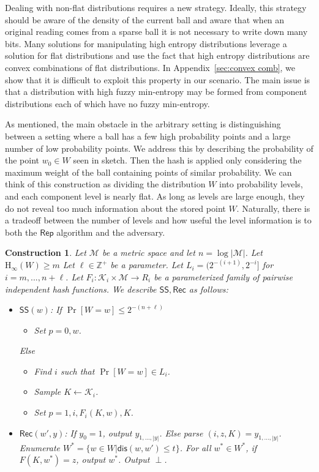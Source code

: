 \documentclass[11pt]{article}
\newcommand{\apref}[1]{\mbox{Appendix~\ref{#1}}}
\newcommand{\class}[1]{{\ensuremath{\mathsf{#1}}}}
\newcommand{\rep}{\ensuremath{\class{Rep}}\xspace}
\newcommand{\sketch}{\ensuremath{\class{SS}}\xspace}
\newcommand{\rec}{\ensuremath{\class{Rec}}\xspace}
\newcommand{\dis}{\ensuremath{\mathsf{dis}}}
\newcommand{\Hoo}{\mathrm{H}_\infty}
\newtheorem{construction}[theorem]{Construction}
\begin{document}
Dealing with non-flat distributions requires a new strategy.  Ideally, this strategy should be aware of the density of the current ball and aware that when an original reading comes from a sparse ball it is not necessary to write down many bits.  Many solutions for manipulating high entropy distributions leverage a solution for flat distributions and use the fact that high entropy distributions are convex combinations of flat distributions.  In \apref{sec:convex comb}, we show that it is difficult to exploit this property in our scenario.  The main issue is that a distribution with high fuzzy min-entropy may be formed from component distributions each of which have no fuzzy min-entropy.

As mentioned, the main obstacle in the arbitrary setting is distinguishing between a setting where a ball has a few high probability points and a large number of low probability points.
We address this by describing the probability of the point $w_0\in W$ seen in sketch.  Then the hash is applied only considering the maximum weight of the ball containing points of similar probability.  We can think of this construction as dividing the distribution $W$ into probability levels, and each component level is nearly flat.  As long as levels are large enough, they do not reveal too much information about the stored point $W$.  Naturally, there is a tradeoff between the number of levels and how useful the level information is to both the \rep algorithm and the adversary.

\begin{construction}
\label{cons:leveling}
Let $\mathcal{M}$ be a metric space and let $n =\log |\mathcal{M}|$.  Let $\Hoo(W) \ge m$
Let $\ell\in\mathbb{Z}^+$ be a parameter.  Let $L_i = (2^{-(i+1)}, 2^{-i}]$ for $i=m,..., n+\ell$.  Let $F_i :\mathcal{K}_i\times \mathcal{M}\rightarrow R_i$ be a parameterized family of pairwise independent hash functions.  We describe $\sketch, \rec$ as follows: 
\begin{itemize}
\item $\sketch(w)$:
\subitem If $\Pr[W=w]\le 2^{-(n+\ell)}$
\begin{itemize}
\item Set $p=0, w$.
\end{itemize}
\subitem Else
\begin{itemize}
\item Find $i$ such that $\Pr[W=w]\in L_i$.  
\item Sample $K\leftarrow \mathcal{K}_i$.
\item Set $p =1,  i, F_i(K, w), K$.
\end{itemize}
\item $\rec(w', y)$:
\subitem If $y_0 = 1$, output $y_{1,..., |y|}$.
\subitem Else parse $(i, z, K) = y_{1,..., |y|}$.
\subitem Enumerate $W^* = \{w \in W | \dis(w, w')\le t\}$.
\subitem For all $w^*\in W^*$, if $F(K, w^*) = z$, output $w^*$.
\subitem Output $\perp$.
\end{itemize}
\end{construction}
\end{document}
